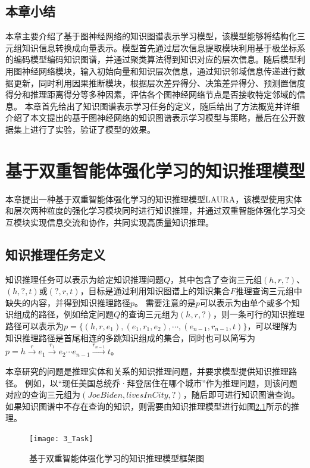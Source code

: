 \documentclass[algorithmlist, AutoFakeBold, AutoFakeSlant, figurelist, tablelist, nomlist, engineering]{seuthesix}
\begin{document}
\section{本章小结}
本章主要介绍了基于图神经网络的知识图谱表示学习模型，该模型能够将结构化三元组知识信息转换成向量表示。模型首先通过层次信息提取模块利用基于极坐标系的编码模型编码知识图谱，并通过聚类算法得到知识对应的层次信息。随后模型利用图神经网络模块，输入初始向量和知识层次信息，通过知识邻域信息传递进行数据更新，同时利用因果推断模块，根据层次差异得分、决策差异得分、预测置信度得分和推理距离得分等多种因素，评估各个图神经网络节点是否接收特定邻域的信息。
本章首先给出了知识图谱表示学习任务的定义，随后给出了方法概览并详细介绍了本文提出的基于图神经网络的知识图谱表示学习模型与策略，最后在公开数据集上进行了实验，验证了模型的效果。


\chapter{基于双重智能体强化学习的知识推理模型}
本章提出一种基于双重智能体强化学习的知识推理模型LAURA，该模型使用实体和层次两种粒度的强化学习模块同时进行知识推理，并通过双重智能体强化学习交互模块实现信息交流和协作，共同实现高质量知识推理。

\section{知识推理任务定义}
知识推理任务可以表示为给定知识推理问题$Q$，其中包含了查询三元组$(h, r, ?)$、$(h, ?, t)$或$(?, r, t)$，目标是通过利用知识图谱上的知识集合$F$推理查询三元组中缺失的内容，并得到知识推理路径$p$。
需要注意的是$p$可以表示为由单个或多个知识组成的路径，例如给定问题$Q$的查询三元组为$(h, r, ?)$，则一条可行的知识推理路径可以表示为$p=\{(h, r, e_1), (e_1, r_1, e_2), \cdots, (e_{n-1}, r_{n-1}, t)\}$，可以理解为知识推理路径是首尾相连的多跳知识组成的集合，同时也可以简写为$p=h\xrightarrow{r}e_1\xrightarrow{r_1}e_2 \cdots e_{n-1}\xrightarrow{r_{n-1}}t$。

本章研究的问题是推理实体和关系的知识推理问题，并要求模型提供知识推理路径。
例如，以“现任美国总统乔·拜登居住在哪个城市”作为推理问题，则该问题对应的查询三元组为$(Joe Biden, livesInCity, ?)$，随后即可进行知识图谱查询。
如果知识图谱中不存在查询的知识，则需要由知识推理模型进行如图\ref{3_Task}所示的推理。
\begin{figure}[ht]
  \centering
  \texttt{[image: 3\_Task]}
  \caption{基于双重智能体强化学习的知识推理模型框架图}
  \label{3_Task}
\end{figure}
\end{document}
